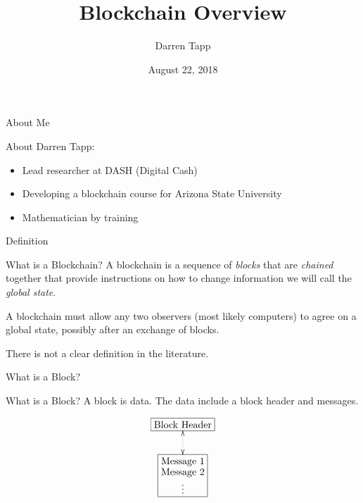 \documentclass{beamer}
\title{Blockchain Overview}
\author{Darren Tapp}
\date{August 22, 2018}
\institute[]{MIT Alumni Club of NH}
\begin{document}

\frame{\titlepage}

  

\begin{frame}{About Me}

  About Darren Tapp:

  \begin{itemize}
    \item Lead researcher at DASH (Digital Cash)
    \item Developing a blockchain course for Arizona State University
    \item Mathematician by training    
  \end{itemize}

\end{frame}


\begin{frame}{Definition}

\begin{block}{What is a Blockchain?}
A blockchain is a sequence of \emph{blocks} that are \emph{chained} together that provide instructions on how to change information we will call the \emph{global state}.

A blockchain must allow any two observers (most likely computers) to agree on a global state, possibly after an exchange of blocks.
\end{block}

\pause

There is not a clear definition in the literature.

  
\end{frame}




\begin{frame}{What is a Block?}
  \vfill

  \begin{block}{What is a Block?}
    A block is data.  The data include a block header and messages.
  \end{block}

\vfill
  

\[  
  \xymatrix{
  *+[F]{\txt{Block Header}} \ar@{<.>}[d]\\
  *+[F]{\txt{Message 1 \\ Message 2 \\ \vdots} }} 
\]


\vfill

\end{frame}
\end{document}
